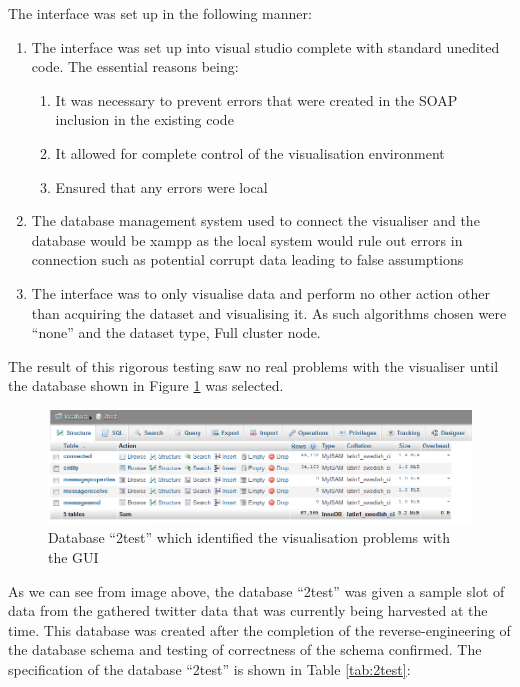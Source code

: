 The interface was set up in the following manner:
\begin{enumerate}
	\item The interface was set up into visual studio complete with standard
unedited code. The essential reasons being:
	
	\begin{enumerate}
		\item It was necessary to prevent errors that were created in the SOAP inclusion in the existing code
		
		\item It allowed for complete control of the visualisation environment
		
		\item Ensured that any errors were local
	\end{enumerate}
	
	\item The database management system used to connect the visualiser and the database would be xampp as the local system would rule out errors in connection such as potential corrupt data leading to false assumptions
	
	\item The interface was to only visualise data and perform no other action other than acquiring the dataset and visualising it. As such algorithms chosen were ``none'' and the dataset type, Full cluster node.
\end{enumerate}

The result of this rigorous testing saw no real problems with the visualiser until the database shown in Figure \ref{fig:2test} was selected. 

\begin{figure}[htbp]%
\centering
\includegraphics[width=0.5\columnwidth]{./img/2test}%
\caption{Database ``2test'' which identified 
the visualisation problems with the GUI
}%
\label{fig:2test}%
\end{figure}

As we can see from image above, the database ``2test'' was given a sample slot of data from the gathered twitter data that was currently being harvested at the time. This database was created after the completion of the reverse-engineering of the database schema and testing of correctness of the schema confirmed. The specification of the database ``2test'' is shown in Table \ref{tab:2test}:

